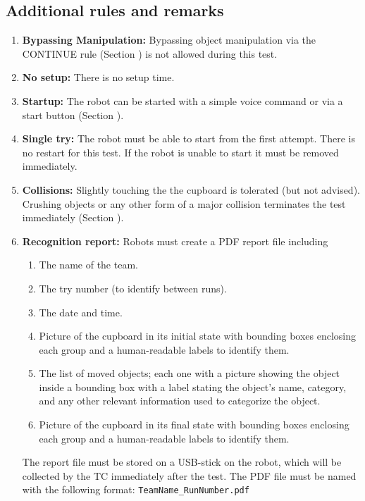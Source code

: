 \subsection{Additional rules and remarks}
\begin{enumerate}
	\item \textbf{Bypassing Manipulation:} Bypassing object manipulation via the CONTINUE rule (Section ) is not allowed during this test.
	\item \textbf{No setup:} There is no setup time.
	\item \textbf{Startup:} The robot can be started with a simple voice command or via a start button (Section ). 
	\item \textbf{Single try:} The robot must be able to start from the first attempt. There is no restart for this test. If the robot is unable to start it must be removed immediately.
	\item \textbf{Collisions:} Slightly touching the the cupboard is tolerated (but not advised). Crushing objects or any other form of a major collision terminates the test immediately (Section ).
	\item \textbf{Recognition report:} Robots must create a PDF report file including
		\begin{enumerate}
			\item The name of the team.
			\item The try number (to identify between runs).
			\item The date and time.
			\item Picture of the cupboard in its initial state with bounding boxes enclosing each group and a human-readable labels to identify them.
			\item The list of moved objects; each one with a picture showing the object inside a bounding box with a label stating the object's name, category, and any other relevant information used to categorize the object.
			\item Picture of the cupboard in its final state with bounding boxes enclosing each group and a human-readable labels to identify them.
		\end{enumerate}

		The report file must be stored on a USB-stick on the robot, which will be collected by the TC immediately after the test. The PDF file must be named with the following format: \texttt{TeamName\_RunNumber.pdf}\\


\end{enumerate}
